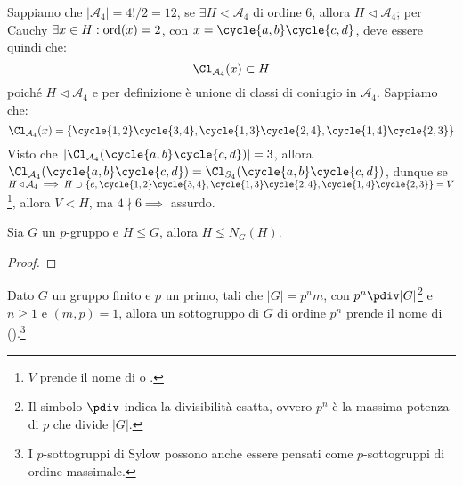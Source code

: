 \documentclass[11pt]{scrartcl}
\begin{document}
\begin{example}
    Sappiamo che $|\mathcal{A}_4| = 4!/2 = 12$, se $\exists H < \mathcal{A}_4$ di ordine $6$, allora $H \triangleleft \mathcal{A}_4$; per \hyperref[p:Cauchy]{Cauchy}
    $\exists x \in H : \operatorname{ord}(x) = 2$, con $x = \cycle{a,b}\cycle{c,d}$, deve essere quindi che:
        \[ \Cl_{\mathcal{A}_4}(x) \subset H
            \]
    poiché $H \triangleleft \mathcal{A}_4$ e per definizione è unione di classi di coniugio in $\mathcal{A}_4$. Sappiamo che:
        \[ \Cl_{\mathcal{A}_4}(x) = \{ \cycle{1,2}\cycle{3,4}, \cycle{1,3}\cycle{2,4}, \cycle{1,4}\cycle{2,3}\}
            \]
    Visto che $|\Cl_{\mathcal{A}_4}(\cycle{a,b} \cycle{c,d})| = 3$, allora $\Cl_{\mathcal{A}_4}(\cycle{a,b} \cycle{c,d}) = \Cl_{S_4}(\cycle{a,b} \cycle{c,d})$,
    dunque se $H \triangleleft \mathcal{A}_4 \implies H \supset \{e, \cycle{1,2}\cycle{3,4}, \cycle{1,3}\cycle{2,4}, \cycle{1,4}\cycle{2,3}\} = V$ \footnote{$V$ prende il nome di  o .},
    allora $V < H$, ma $4 \nmid 6 \implies$ assurdo.
\end{example}

\begin{lemma}
    \label{l:1.95}
    Sia $G$ un $p$-gruppo e $H \lneq G$, allora $H \lneq N_G(H)$.
\end{lemma}

\begin{proof}
    
\end{proof}

\begin{definition}
    Dato $G$ un gruppo finito e $p$ un primo, tali che $|G| = p^nm$, con $p^n \pdiv |G|$\footnote{Il simbolo $\pdiv$ indica la divisibilità esatta, ovvero $p^n$ è la massima potenza di $p$ che divide $|G|$.} 
    e $n \geq 1$ e $(m,p) = 1$, allora un sottogruppo di $G$ di ordine $p^n$ prende il nome di  ().\footnote{I $p$-sottogruppi di Sylow possono anche essere pensati come $p$-sottogruppi di ordine massimale.}
\end{definition}

\newpage
\end{document}
